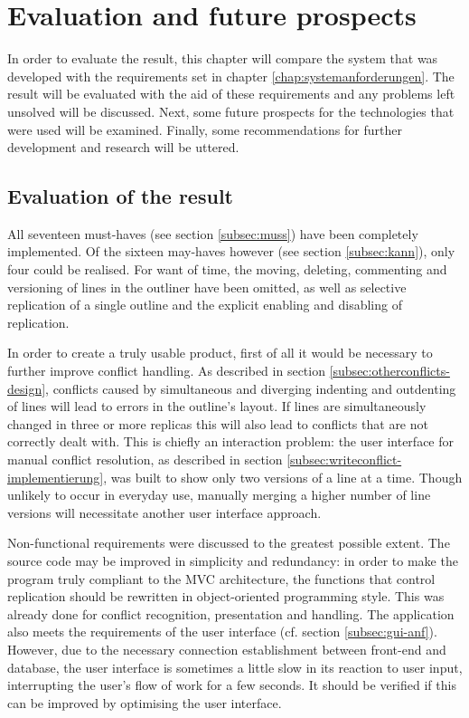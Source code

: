 \chapter{Evaluation and future prospects}
\label{chap:fazit}

In order to evaluate the result, this chapter will compare the system that was developed with the requirements set in chapter \ref{chap:systemanforderungen}. The result will be evaluated with the aid of these requirements and any problems left unsolved will be discussed. Next, some future prospects for the technologies that were used will be examined. Finally, some recommendations for further development and research will be uttered.

\section{Evaluation of the result}

All seventeen must-haves (see section \ref{subsec:muss}) have been completely implemented. Of the sixteen may-haves however (see section \ref{subsec:kann}), only four could be realised. For want of time, the moving, deleting, commenting and versioning of lines in the outliner have been omitted, as well as selective replication of a single outline and the explicit enabling and disabling of replication.

In order to create a truly usable product, first of all it would be necessary to further improve conflict handling. As described in section \ref{subsec:otherconflicts-design}, conflicts caused by simultaneous and diverging indenting and outdenting of lines will lead to errors in the outline's layout. If lines are simultaneously changed in three or more replicas this will also lead to conflicts that are not correctly dealt with. This is chiefly an interaction problem: the user interface for manual conflict resolution, as described in section \ref{subsec:writeconflict-implementierung}, was built to show only two versions of a line at a time. Though unlikely to occur in everyday use, manually merging a higher number of line versions will necessitate another user interface approach.

Non-functional requirements were discussed to the greatest possible extent. The source code may be improved in simplicity and redundancy: in order to make the program truly compliant to the MVC architecture, the functions that control replication should be rewritten in object-oriented programming style. This was already done for conflict recognition, presentation and handling. The application also meets the requirements of the user interface (cf. section \ref{subsec:gui-anf}). However, due to the necessary connection establishment between front-end and database, the user interface is sometimes a little slow in its reaction to user input, interrupting the user's flow of work for a few seconds. It should be verified if this can be improved by optimising the user interface.

